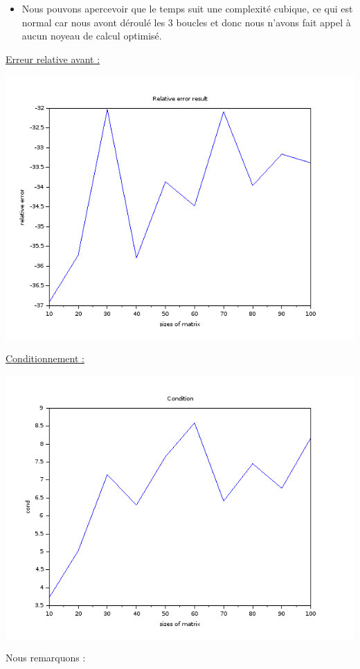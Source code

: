 \documentclass[12pt, letterpaper]{article}
\begin{document}
\begin{itemize}
\item Nous pouvons apercevoir que le temps suit une complexité
  cubique, ce qui est normal car nous avont déroulé les 3 boucles et
  donc nous n'avons fait appel à aucun noyeau de calcul optimisé.
\end{itemize}

\underline{Erreur relative avant :}

\includegraphics[scale=0.5]{img/mylu_error.png}

\underline{Conditionnement :}

\includegraphics[scale=0.5]{img/mylu_cond.png}

Nous remarquons :
\end{document}
